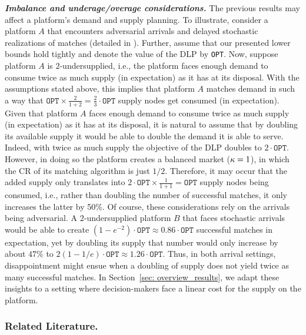 \emph{\textbf{Imbalance and underage/overage considerations.}} The previous results may affect a platform's demand and supply planning. To illustrate, consider a platform $A$ that encounters adversarial arrivals and delayed stochastic realizations of matches ({detailed in }). Further, assume that our presented lower bounds hold tightly and denote the value of the DLP by \texttt{OPT}. Now, suppose platform $A$ is $2$-undersupplied, i.e., the platform faces enough demand to consume twice as much supply (in expectation) as it has at its disposal. With the assumptions stated above, this implies that platform $A$ matches demand in such a way that $\texttt{OPT} \times \frac{2}{1+2}= \frac{2}{3} \cdot \texttt{OPT}$ supply nodes get consumed (in expectation). Given that platform $A$ faces enough demand to consume twice as much supply (in expectation) as it has at its disposal, it is natural to assume that by doubling its available supply it would be able to double the demand it is able to serve. Indeed, with twice as much supply the objective of the DLP doubles to $2 \cdot \texttt{OPT}$. However, in doing so the platform creates a balanced market ($\kappa=1$), in which the CR of its matching algorithm is just $1/2$. Therefore, it may occur that the added supply only translates into $2\cdot \texttt{OPT} \times\frac{1}{1+1}=\texttt{OPT}$ supply nodes being consumed, i.e., rather than doubling the number of successful matches, it only increases the latter by 50\%. Of course, these considerations rely on the arrivals being adversarial. A $2$-undersupplied platform $B$ that faces stochastic arrivals would be able to create $(1-e^{-2}) \cdot \texttt{OPT} \approx 0.86 \cdot  \texttt{OPT}$ successful matches in expectation, yet by doubling its supply that number would only increase by about $47\%$ to $2(1-1/e) \cdot \texttt{OPT}\approx 1.26 \cdot \texttt{OPT}$. Thus, in both arrival settings, disappointment might ensue when a doubling of supply does not yield twice as many successful matches. In Section~\ref{sec: overview_results}, we adapt these insights to a setting where decision-makers face a linear cost for the supply on the platform. 


\subsubsection*{Related Literature.}
\label{ssec: related_literature}



